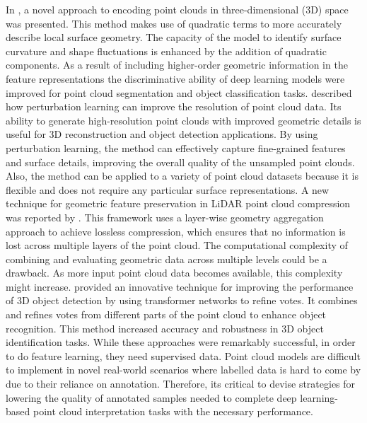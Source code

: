 In \cite{sun2021quadratic}, a novel approach to encoding point clouds in three-dimensional (3D) space was presented. This method makes use of quadratic terms to more accurately describe local surface geometry. The capacity of the model to identify surface curvature and shape fluctuations is enhanced by the addition of quadratic components. As a result of including higher-order geometric information in the feature representations the discriminative ability of deep learning models were improved for point cloud segmentation and object classification tasks.  \cite{ding2021point} described how perturbation learning can improve the resolution of point cloud data. Its ability to generate high-resolution point clouds with improved geometric details is useful for 3D reconstruction and object detection applications. By using perturbation learning, the method can effectively capture fine-grained features and surface details, improving the overall quality of the unsampled point clouds. Also, the method can be applied to a variety of point cloud datasets because it is flexible and does not require any particular surface representations.  A new technique for geometric feature preservation in \ac{LiDAR} point cloud compression was reported by \cite{song2021layer}. This framework uses a layer-wise geometry aggregation approach to achieve lossless compression, which ensures that no information is lost across multiple layers of the point cloud.  The computational complexity of combining and evaluating geometric data across multiple levels could be a drawback. As more input point cloud data becomes available, this complexity might increase. \cite{zhao2021transformer3d} provided an innovative technique for improving the performance of 3D object detection by using transformer networks to refine votes. It combines and refines votes from different parts of the point cloud to enhance object recognition. This method increased accuracy and robustness in 3D object identification tasks. While these approaches were remarkably successful, in order to do feature learning, they need supervised data. Point cloud models are difficult to implement in novel real-world scenarios where labelled data is hard to come by due to their reliance on annotation. Therefore, its critical to devise strategies for lowering the quality of annotated samples needed to complete deep learning-based point cloud interpretation tasks with the necessary performance\cite{mei2022unsupervised}.